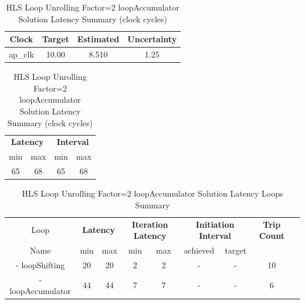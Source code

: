 \begin{table}[H]
	\centering
	\begin{minipage}[t]{0.45\linewidth}
		\centering
		\begin{tabular}{|c|c|c|c|}
			\hline
			\textbf{Clock} & \textbf{Target} & \textbf{Estimated} & \textbf{Uncertainty} \\
			\hline
			ap\_clk & 10.00 & 8.510 & 1.25 \\
			\hline
		\end{tabular}
		\caption{HLS Loop Unrolling Factor=2 loopAccumulator Solution Timing Summary (ns)}
		\label{tab:hls-loop-unrolling-2-loopAccumulator-solution-timing-summary}
	\end{minipage}
	\hfill
	\begin{minipage}[t]{0.45\linewidth}
		\centering
		\begin{tabular}{|c|c|c|c|}
			\hline
			\multicolumn{2}{|c|}{\textbf{Latency}} & \multicolumn{2}{|c|}{\textbf{Interval}} \\
			min & max & min & max \\
			\hline
			65 & 68 & 65 & 68 \\
			\hline
		\end{tabular}
		\caption{HLS Loop Unrolling Factor=2 loopAccumulator Solution Latency Summary (clock cycles)}
		\label{tab:hls-loop-unrolling-2-loopAccumulator-solution-latency-summary}
	\end{minipage}
\end{table}

\begin{table}[H]
	\centering
	\begin{tabular}{|c|c|c|c|c|c|c|c|c|}
		\hline
		\multicolumn{1}{|c|}{Loop} & \multicolumn{2}{|c|}{\textbf{Latency}} & \multicolumn{2}{c|}{\textbf{Iteration Latency}} & \multicolumn{2}{c|}{\textbf{Initiation Interval}} & \multicolumn{1}{c|}{\textbf{Trip Count}}  \\
		Name & min & max & min & max & achieved & target &  \\
		\hline
		- loopShifting & 20 & 20 & 2 & 2 & - & - & 10 \\
		- loopAccumulator & 44 & 44 & 7 & 7 & - & - & 6 \\
		\hline
	\end{tabular}
	\caption{HLS Loop Unrolling Factor=2 loopAccumulator Solution Latency Loops Summary }
	\label{tab:hls-loop-unrolling-2-loopAccumulator-solution-loop-summary}
\end{table}

